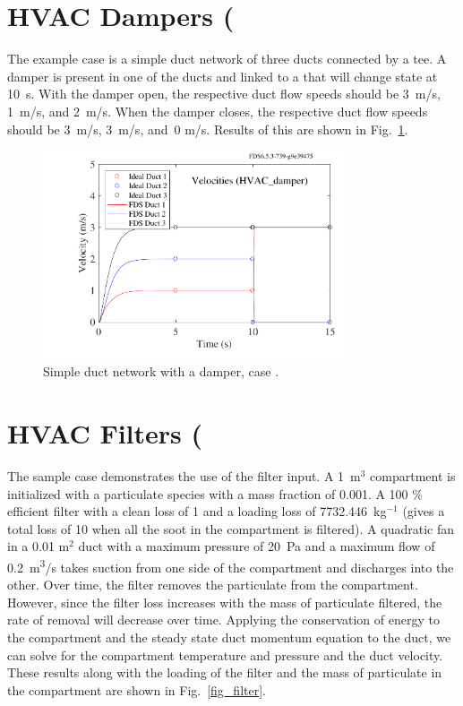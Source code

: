 \documentclass[11pt]{book}
\begin{document}
\clearpage

\section{HVAC Dampers (\texorpdfstring{})}

The  example case is a simple duct network of three ducts connected by a tee.  A damper is present in one of the ducts and linked to a  that will change state at 10~s.  With the damper open, the respective duct flow speeds should be 3~m/s, 1~m/s, and 2~m/s.  When the damper closes, the respective duct flow speeds should be 3~m/s, 3~m/s, and~0 m/s.  Results of this are shown in Fig.~\ref{fig:HVAC_damper}.

\begin{figure}[h!]
\begin{center}
\includegraphics[width=3.5in]{SCRIPT_FIGURES/HVAC_damper}
\caption[Example case ]{Simple duct network with a damper, case .}
\label{fig:HVAC_damper}
\end{center}
\end{figure}


\clearpage

\section{HVAC Filters (\texorpdfstring{})}

The sample case  demonstrates the use of the filter input.  A 1~m$^3$ compartment is initialized with a particulate species with a mass fraction of 0.001.  A 100 \% efficient filter with a clean loss of 1 and a loading loss of 7732.446~kg$^{-1}$ (gives a total loss of 10 when all the soot in the compartment is filtered).  A quadratic fan in a 0.01 m$^2$ duct with a maximum pressure of 20~Pa and a maximum flow of 0.2~\si{m^3/s} takes suction from one side of the compartment and discharges into the other.  Over time, the filter removes the particulate from the compartment.  However, since the filter loss increases with the mass of particulate filtered, the rate of removal will decrease over time.  Applying the conservation of energy to the compartment and the steady state duct momentum equation to the duct, we can solve for the compartment temperature and pressure and the duct velocity.  These results along with the loading of the filter and the mass of particulate in the compartment are shown in Fig.~\ref{fig_filter}.
\end{document}
